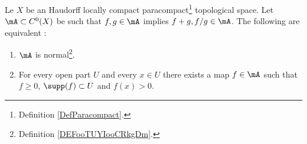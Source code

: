 \begin{theorem}	\label{THOooUEKKooLuCvbr}
	Le \( X\) be an Haudorff locally compact paracompact\footnote{Definition \ref{DefParacompact}.} topological space. Let \( \mA\subset C^0(X)\) be such that \( f,g\in \mA\) implies \( f+g,f/g\in\mA\). The following are equivalent :
	\begin{enumerate}
		\item
		      \( \mA\) is normal\footnote{Definition \ref{DEFooTUYIooCRkgDm}.}.
		\item
		      For every open part \( U\) and every \( x\in U\) there exists a map \( f\in\mA\) such that \( f\geq 0\), \( \supp(f)\subset U\) and \( f(x)>0\).
	\end{enumerate}
\end{theorem}

